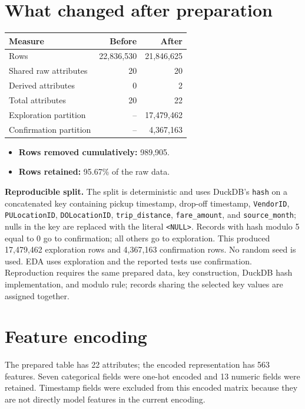 \documentclass[10pt,a4paper]{article}
\newcommand{\code}[1]{\texttt{#1}}
\begin{document}
\section{What changed after preparation}
\begin{center}\small
\begin{tabularx}{\linewidth}{@{}L{3.2cm}rr@{}}
\toprule \textbf{Measure} & \textbf{Before} & \textbf{After}\\\midrule
Rows & 22,836,530 & 21,846,625\\
Shared raw attributes & 20 & 20\\
Derived attributes & 0 & 2\\
Total attributes & 20 & 22\\
Exploration partition & -- & 17,479,462\\
Confirmation partition & -- & 4,367,163\\
\bottomrule\end{tabularx}
\end{center}
\begin{itemize}
\item \textbf{Rows removed cumulatively:} 989,905.
\item \textbf{Rows retained:} 95.67\% of the raw data.
\end{itemize}

\textbf{Reproducible split.} The split is deterministic and uses DuckDB's \code{hash} on a concatenated key containing pickup timestamp, drop-off timestamp, \code{VendorID},   \code{PULocationID}, 
\code{DOLocationID}, \code{trip\_distance}, \code{fare\_amount}, and \code{source\_month}; nulls in the key are replaced with the literal \code{<NULL>}. Records with hash modulo 5 equal to 0 go to confirmation; all others go to exploration. This produced 17,479,462 exploration rows and 4,367,163 confirmation rows. No random seed is used. EDA uses exploration and the reported tests use confirmation. Reproduction requires the same prepared data, key construction, DuckDB hash implementation, and modulo rule; records sharing the selected key values are assigned together.

\section{Feature encoding}
The prepared table has 22 attributes; the encoded representation has 563 features. Seven categorical fields were one-hot encoded and 13 numeric fields were retained. Timestamp fields were excluded from this encoded matrix because they are not directly model features in the current encoding.
\end{document}
